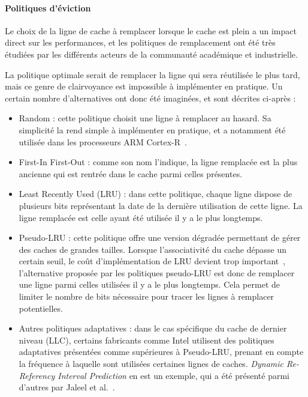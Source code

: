 \paragraph{Politiques d'éviction}

Le choix de la ligne de cache à remplacer lorsque le cache est plein a un impact direct sur les performances, et les politiques de remplacement ont été très étudiées par les différents acteurs de la communauté académique et industrielle.

La politique optimale serait de remplacer la ligne qui sera réutilisée le plus tard, mais ce genre de clairvoyance est impossible à implémenter en pratique.
Un certain nombre d'alternatives ont donc été imaginées, et sont décrites ci-après :
\begin{itemize}
  \item Random : cette politique choisit une ligne à remplacer au hasard. Sa simplicité la rend simple à implémenter en pratique, et a notamment été utilisée dans les processeurs ARM Cortex-R~\cite{ARM-Cortex-R}.
  \item First-In First-Out : comme son nom l'indique, la ligne remplacée est la plus ancienne qui est rentrée dans le cache parmi celles présentes.
  \item Least Recently Used (LRU) : dans cette politique, chaque ligne dispose de plusieurs bits représentant la date de la dernière utilisation de cette ligne. La ligne remplacée est celle ayant été utilisée il y a le plus longtemps.
  \item Pseudo-LRU : cette politique offre une version dégradée permettant de gérer des caches de grandes tailles.
Lorsque l'associativité du cache dépasse un certain seuil, le coût d'implémentation de LRU devient trop important~\cite{Kedzierski2010}, l'alternative proposée par les politiques pseudo-LRU est donc de remplacer une ligne parmi celles utilisées il y a le plus longtemps.
Cela permet de limiter le nombre de bits nécessaire pour tracer les lignes à remplacer potentielles.
  \item Autres politiques adaptatives : dans le cas spécifique du cache de dernier niveau (LLC), certains fabricants comme Intel utilisent des politiques adaptatives présentées comme supérieures à Pseudo-LRU, prenant en compte la fréquence à laquelle sont utilisées certaines lignes de caches.
    \emph{Dynamic Re-Referency Interval Prediction} en est un exemple, qui a été présenté parmi d'autres par Jaleel et al.~\cite{Jaleel2010}.
\end{itemize}

